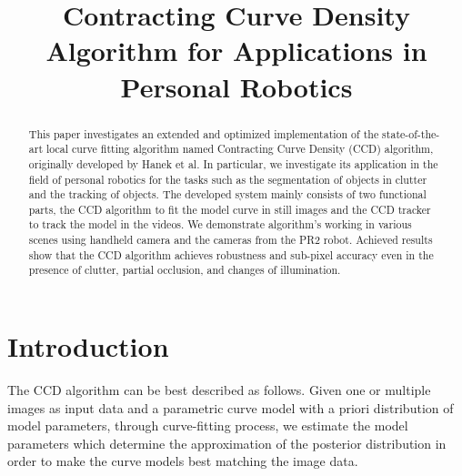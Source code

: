 \documentclass[conference]{IEEEtran}
\begin{document}
%
\title{Contracting Curve Density Algorithm for Applications in Personal Robotics}


\author{
}

\maketitle

\begin{abstract}
This paper investigates an extended and optimized
implementation of the state-of-the-art local curve fitting algorithm
named Contracting Curve Density (CCD) algorithm, originally developed 
by Hanek et al. In particular, we investigate its application  
in the field of personal robotics for the tasks such as the segmentation
of objects in clutter and the tracking of objects. 
The developed system mainly consists of two functional parts, the CCD
algorithm to fit the model curve in still images and the CCD tracker to
track the model in the videos. We demonstrate algorithm's working 
in various scenes using handheld camera and the cameras from the 
PR2 robot. Achieved results show that the CCD algorithm achieves 
robustness and sub-pixel accuracy even in the presence of clutter, 
partial occlusion, and changes of illumination.
\end{abstract}

\IEEEpeerreviewmaketitle

\section{Introduction}
The CCD algorithm can be best described as follows. Given one or multiple images as input
data and a parametric curve model with a priori distribution of model
parameters, through curve-fitting process, we estimate the model
parameters which determine the approximation of the posterior
distribution in order to make the curve models best matching the image data.
\end{document}
